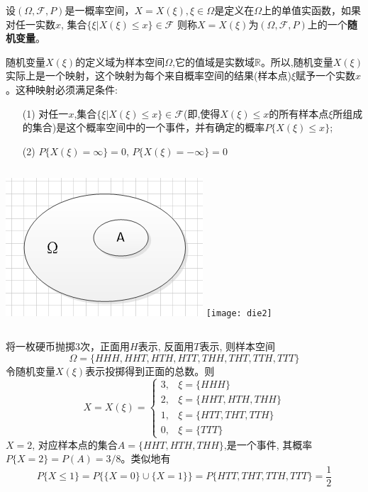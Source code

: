 \begin{frame}
\begin{definition}
	设$(\Omega,\mathcal{F},P)$是一概率空间，$X=X(\xi),\xi\in\Omega$是定义在$\Omega$上的单值实函数，如果对任一实数$x$, 集合$\{\xi|X(\xi)\le x\}\in\mathcal{F}$ 则称$X=X(\xi)$为$(\Omega,\mathcal{F},P)$上的一个\textbf{随机变量}。
	
	随机变量$X(\xi)$的定义域为样本空间$\Omega$,它的值域是实数域$\mathbb{R}$。所以,随机变量$X(\xi)$实际上是一个映射，这个映射为每个来自概率空间的结果(样本点)$\xi$赋予一个实数$x$。这种映射必须满足条件:
	\begin{itemize}
		\item[(1)] 对任一$x$,集合$\{\xi|X(\xi)\le x\}\in\mathcal{F}$(即,使得$X(\xi)\le x$的所有样本点$\xi$所组成的集合)是这个概率空间中的一个事件，并有确定的概率$P\{X(\xi)\le x\}$;
		\item[(2)] $P\{X(\xi)=\infty \}=0$, $P\{X(\xi)=-\infty \}=0$
	\end{itemize}
\end{definition}
\begin{columns}
	\includegraphics[scale=0.2]{geometry}
	\texttt{[image: die2]}
\end{columns}
\end{frame}

\begin{frame}
\begin{example}
	将一枚硬币抛掷3次，正面用$H$表示, 反面用$T$表示, 则样本空间
	\[\Omega=\{HHH,HHT,HTH,HTT,THH,THT,TTH,TTT\} \]
	令随机变量$X(\xi)$表示投掷得到正面的总数。则
	\[ 
		X=X(\xi)=
		\begin{cases}
		3, &\xi=\{HHH\}\\
		2, &\xi=\{HHT,HTH,THH\}\\
		1, &\xi=\{HTT,THT,TTH\}\\
		0, &\xi=\{TTT\}
		\end{cases}
	\]
	$X=2$, 对应样本点的集合$A=\{HHT,HTH,THH\}$,是一个事件, 其概率$P\{X=2\}=P(A)=3/8$。类似地有
	\[ P\{X\le 1\}=P\{\{X=0\}\cup\{X=1\}\}=P\{HTT,THT,TTH,TTT\}=\frac{1}{2} \]
\end{example}
\end{frame}

